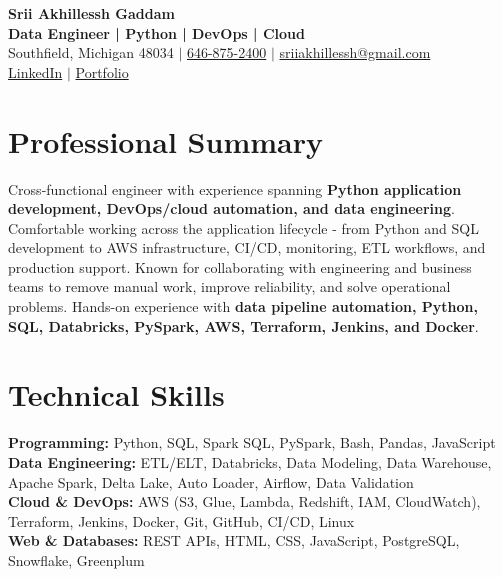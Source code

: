 \documentclass[letterpaper,10pt]{article}
\begin{document}
\fontsize{9.35pt}{10.45pt}\selectfont

\begin{center}
    {\LARGE \textbf{Srii Akhillessh Gaddam}} \\[-1pt]
    \textbf{Data Engineer | Python | DevOps | Cloud} \\[2pt]
    Southfield, Michigan 48034 $|$
    \href{tel:6468752400}{646-875-2400} $|$
    \href{mailto:sriiakhillessh@gmail.com}{sriiakhillessh@gmail.com} \\[1pt]
    \href{https://www.linkedin.com/in/srii-akhiilessh-gaddam-b48668191/}{LinkedIn} $|$
    \href{https://sriiakhillesshg.github.io/portfolio/}{Portfolio}
\end{center}
\vspace{-8pt}

\section{Professional Summary}
\small{Cross-functional engineer with experience spanning \textbf{Python application development, DevOps/cloud automation, and data engineering}. Comfortable working across the application lifecycle - from Python and SQL development to AWS infrastructure, CI/CD, monitoring, ETL workflows, and production support. Known for collaborating with engineering and business teams to remove manual work, improve reliability, and solve operational problems. Hands-on experience with \textbf{data pipeline automation, Python, SQL, Databricks, PySpark, AWS, Terraform, Jenkins, and Docker}.}

\section{Technical Skills}
\small{
\textbf{Programming:} Python, SQL, Spark SQL, PySpark, Bash, Pandas, JavaScript \\
\textbf{Data Engineering:} ETL/ELT, Databricks, Data Modeling, Data Warehouse, Apache Spark, Delta Lake, Auto Loader, Airflow, Data Validation \\
\textbf{Cloud \& DevOps:} AWS (S3, Glue, Lambda, Redshift, IAM, CloudWatch), Terraform, Jenkins, Docker, Git, GitHub, CI/CD, Linux \\
\textbf{Web \& Databases:} REST APIs, HTML, CSS, JavaScript, PostgreSQL, Snowflake, Greenplum
}
\end{document}
